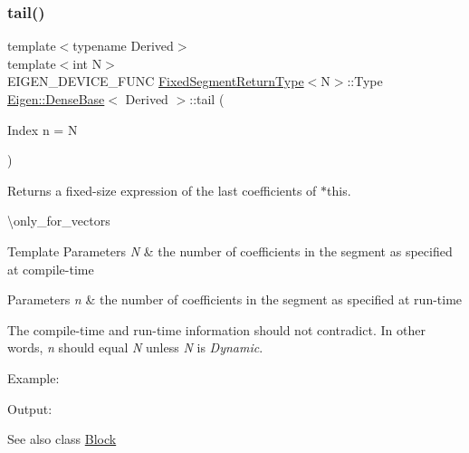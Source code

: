 \subsubsection{\texorpdfstring{tail()}{tail()}\hspace{0.1cm}{\footnotesize\ttfamily [2/2]}}
{\footnotesize\ttfamily template$<$typename Derived$>$ \\
template$<$int N$>$ \\
E\+I\+G\+E\+N\+\_\+\+D\+E\+V\+I\+C\+E\+\_\+\+F\+U\+NC \mbox{\hyperlink{struct_eigen_1_1_dense_base_1_1_fixed_segment_return_type}{Fixed\+Segment\+Return\+Type}}$<$N$>$\+::Type \mbox{\hyperlink{class_eigen_1_1_dense_base}{Eigen\+::\+Dense\+Base}}$<$ Derived $>$\+::tail (\begin{DoxyParamCaption}\item[{Index}]{n = {\ttfamily N} }\end{DoxyParamCaption})\hspace{0.3cm}{\ttfamily [inline]}}

\begin{DoxyReturn}{Returns}
a fixed-\/size expression of the last coefficients of $\ast$this.
\end{DoxyReturn}
\textbackslash{}only\+\_\+for\+\_\+vectors


\begin{DoxyTemplParams}{Template Parameters}
{\em N} & the number of coefficients in the segment as specified at compile-\/time \\
\hline
\end{DoxyTemplParams}

\begin{DoxyParams}{Parameters}
{\em n} & the number of coefficients in the segment as specified at run-\/time\\
\hline
\end{DoxyParams}
The compile-\/time and run-\/time information should not contradict. In other words, {\itshape n} should equal {\itshape N} unless {\itshape N} is {\itshape Dynamic}.

Example\+: 
\begin{DoxyCodeInclude}{0}
\end{DoxyCodeInclude}
 Output\+: 
\begin{DoxyVerbInclude}
\end{DoxyVerbInclude}


\begin{DoxySeeAlso}{See also}
class \mbox{\hyperlink{class_eigen_1_1_block}{Block}} 
\end{DoxySeeAlso}
\mbox{\label{class_eigen_1_1_dense_base_a5fe4cee91037d9586f72bafa5fdd4bd2}} 
